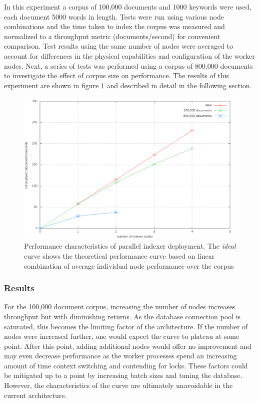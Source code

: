 \documentclass[10pt]{article}
\begin{document}
In this experiment a corpus of 100,000 documents and 1000 keywords were
used, each document 5000 words in length. Tests were run using various
node combinations and the time taken to index the corpus was measured and
normalized to a throughput metric (documents/second) for convenient
comparison. Test results using the same number of nodes were averaged
to account for differences in the physical capabilities and
configuration of the worker nodes. Next, a series of tests was
performed using a corpus of 800,000 documents to investigate the
effect of corpus size on performance. The results of this experiment
are shown in figure \ref{fig:parallelization} and described in detail
in the following section.

\begin{figure}[h]
  \begin{center}
    \includegraphics[width=\textwidth,height=!]{parallelization}
  \end{center}
  \caption{Performance characteristics of parallel indexer
    deployment. The \textit{ideal} curve shows the theoretical
    performance curve based on linear combination of average
    individual node performance over the corpus} 
  \label{fig:parallelization}
\end{figure} 

\subsubsection{Results}
For the 100,000 document corpus, increasing the number of nodes
increases throughput but with diminishing returns. As the database
connection pool is saturated, this becomes the limiting factor of the
architecture. If the number of nodes were increased further, one would
expect the curve to plateau at some point. After this point, adding
additional nodes would offer no improvement and may even decrease
performance as the worker processes spend an increasing amount of time
context switching and contending for locks. These factors could be
mitigated up to a point by increasing batch sizes and tuning the
database. However, the characteristics of the curve are ultimately
unavoidable in the current architecture. 
\end{document}
